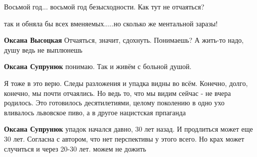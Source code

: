 \begin{itemize}
Восьмой год... восьмой год безысходности. Как тут не отчаяться?

\begin{itemize}
 
так и обняла бы всех вменяемых.....но сколько же ментальной заразы!

 
\textbf{Оксана Высоцкая} Отчаяться, значит, сдохнуть. Понимаешь? А жить-то надо, душу ведь не выплюнешь

 
\textbf{Оксана Супрунюк} понимаю. Так и живём с больной душой.
\end{itemize}

 

Я тоже в это верю. Следы разложения и упадка видны во всём. Конечно, долго,
конечно, мы почти отчаялись. Но ведь то, что мы видим сейчас - не вчера
родилось. Это готовилось десятилетиями, целому поколению в одно ухо вливалось
львовское пиво, а в другое нацистская прпаганда

\begin{itemize}
 
\textbf{Оксана Супрунюк} упадок начался давно, 30 лет назад. И продлиться может еще 30 лет. Согласна с автором, что нет перспективы у этого всего. Но крах может случиться и через 20-30 лет. можем не дожить
\end{itemize}


\end{itemize}
